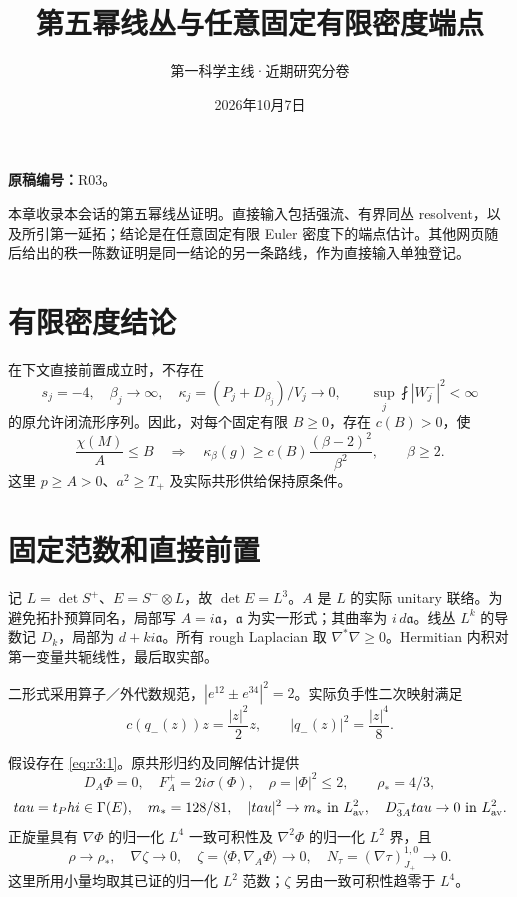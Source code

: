 \documentclass[UTF8,11pt,fontset=none]{ctexart}
\title{第五幂线丛与任意固定有限密度端点}
\author{第一科学主线·近期研究分卷}
\date{2026年10月7日}
\begin{document}
\maketitle
\noindent\textbf{原稿编号：}R03。

本章收录本会话的第五幂线丛证明。直接输入包括强流、有界同丛 resolvent，以及所引第一延拓；结论是在任意固定有限 Euler 密度下的端点估计。其他网页随后给出的秩一陈数证明是同一结论的另一条路线，作为直接输入单独登记。\cite{R03,Strong,Prolongation,FD}

\section{有限密度结论}\label{ch3:ux6709ux9650ux5bc6ux5ea6ux7ed3ux8bba}

在下文直接前置成立时，不存在 \[
s_j=-4,\quad\beta_j\to\infty,\quad
\kappa_j=(P_j+D_{\beta_j})/V_j\to0,
\qquad \sup_j\fint|W_j^-|^2<\infty
\tag{3.1}\label{eq:r3:1}
\] 的原允许闭流形序列。因此，对每个固定有限 \(B\ge0\)，存在 \(c(B)>0\)，使 \[
\frac{\chi(M)}A\le B\quad\Longrightarrow\quad
\kappa_\beta(g)\ge c(B)\frac{(\beta-2)^2}{\beta^2},\qquad\beta\ge2.
\tag{3.2}\label{eq:r3:2}
\] 这里 \(p\ge A>0\)、\(a^2\ge T_+\) 及实际共形供给保持原条件。

\section{固定范数和直接前置}\label{ch3:ux56faux5b9aux8303ux6570ux548cux76f4ux63a5ux524dux7f6e}

记 \(L=\det S^+\)、\(E=S^-\otimes L\)，故 \(\det E=L^3\)。\(A\) 是 \(L\) 的实际 unitary 联络。为避免拓扑预算同名，局部写 \(A=i\mathfrak a\)，\(\mathfrak a\) 为实一形式；其曲率为 \(i\,d\mathfrak a\)。线丛 \(L^k\) 的导数记 \(D_k\)，局部为 \(d+ki\mathfrak a\)。所有 rough Laplacian 取 \(\nabla^*\nabla\ge0\)。Hermitian 内积对第一变量共轭线性，最后取实部。

二形式采用算子／外代数规范，\(|e^{12}\pm e^{34}|^2=2\)。实际负手性二次映射满足 \[
 c(q_-(z))z=\frac{|z|^2}{2}z,\qquad |q_-(z)|^2=\frac{|z|^4}{8}.
\]

假设存在 \eqref{eq:r3:1}。原共形归约及同解估计提供 \[
 D_A\Phi=0,\quad F_A^+=2i\sigma(\Phi),\quad
 \rho=|\Phi|^2\le2,\qquad \rho_* =4/3,
\] \[
 \tau=t_\Phi\in\Gamma(E),\quad m_*=128/81,
 \quad |\tau|^2\to m_*\text{ in }L^2_{\rm av},
 \quad D^-_{3A}\tau\to0\text{ in }L^2_{\rm av}.
\] 正旋量具有 \(\nabla\Phi\) 的归一化 \(L^4\) 一致可积性及 \(\nabla^2\Phi\) 的归一化 \(L^2\) 界，且 \[
 \rho\to\rho_*,\quad \nabla\zeta\to0,\quad
 \zeta=\langle\Phi,\nabla_A\Phi\rangle\to0,
 \quad N_\tau=(\nabla\tau)^{1,0}_{J_+}\to0.
 \tag{3.3}\label{eq:r3:3}
\] 这里所用小量均取其已证的归一化 \(L^2\) 范数；\(\zeta\) 另由一致可积性趋零于 \(L^4\)。
\end{document}
